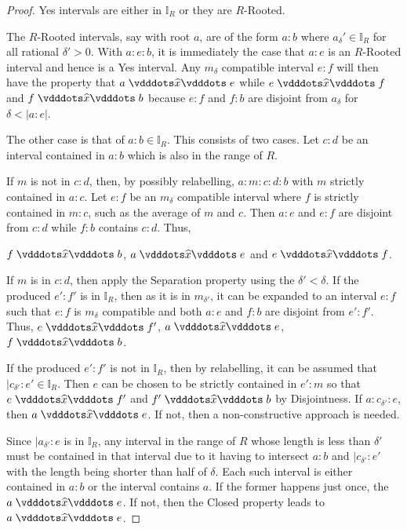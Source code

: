 \documentclass[12pt]{article}
\begin{document}
\begin{proof}
    Yes intervals are either in $\mathbb{I}_R$ or they are $R$-Rooted. 
    
    The $R$-Rooted intervals, say with root $a$, are of the form $a:b$ where $a_\delta' \in \mathbb{I}_R$ for all rational $\delta' >0$. With $a:e:b$, it is immediately the case that $a:e$ is an $R$-Rooted interval and hence is a Yes interval. Any $m_\delta$ compatible interval $e:f$ will then have the property that $a \xora e$ while \sout{$e\xora f$} and \sout{$f\xora b$} because $e:f$ and $f:b$ are disjoint from $a_\delta$ for $\delta < |a:e|$.
 
    The other case is that of $a:b \in \mathbb{I}_R$. This consists of two cases. Let $c:d$ be an interval contained in $a:b$ which is also in the range of $R$. 
    
    If $m$ is not in $c:d$, then, by possibly relabelling, $a:m:c:d:b$ with $m$ strictly contained in $a:c$.  Let $e:f$ be an $m_\delta$ compatible interval where $f$ is strictly contained in $m:c$, such as the average of $m$ and $c$. Then $a:e$ and $e:f$ are disjoint from $c:d$ while $f:b$ contains $c:d$. Thus, \item $f \xora b$, \sout{$a\xora e$} and \sout{$e\xora f$}.

    If $m$ is in $c:d$, then apply the Separation property using the $\delta' < \delta$. If the produced $e':f'$ is in $\mathbb{I}_R$, then as it is in $m_{\delta'}$, it can be expanded to an interval $e:f$ such that $e:f$ is $m_\delta$ compatible and both $a:e$ and $f:b$ are disjoint from $e':f'$. Thus, $e \xora f'$, \sout{$a\xora e$}, \sout{$f\xora b$}.

    If the produced $e':f'$ is not in $\mathbb{I}_R$, then by relabelling, it can be assumed that $|c_{\delta'}:e' \in \mathbb{I}_R$. Then $e$ can be chosen to be strictly contained in $e':m$ so that \sout{$e\xora f'$} and \sout{$f'\xora b$} by Disjointness. If $a:c_{\delta'}:e$, then $a \xora e$. If not, then a non-constructive approach is needed.

    Since $|a_{\delta'}:e$ is in $\mathbb{I}_R$, any interval in the range of $R$ whose length is less than $\delta'$ must be contained in that interval due to it having to intersect $a:b$ and $|c_{\delta'}:e'$ with the length being shorter than half of $\delta$. Each such interval is either contained in $a:b$ or the interval contains $a$. If the former happens just once, the $a \xora e$. If not, then the Closed property leads to $a \xora e$.  
\end{proof}
\end{document}

